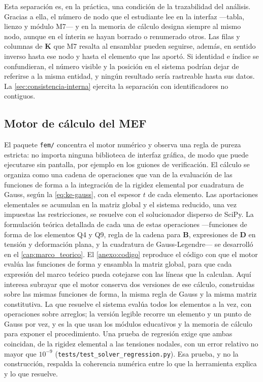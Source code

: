 Esta separación es, en la práctica, una condición de la trazabilidad del análisis. Gracias a ella, el número de nodo que el estudiante lee en la interfaz ---tabla, lienzo y módulo M7--- y en la memoria de cálculo designa siempre al mismo nodo, aunque en el ínterin se hayan borrado o renumerado otros. Las filas y columnas de $\bm{K}$ que M7 resalta al ensamblar pueden seguirse, además, en sentido inverso hasta ese nodo y hasta el elemento que las aportó. Si identidad e índice se confundieran, el número visible y la posición en el sistema podrían dejar de referirse a la misma entidad, y ningún resultado sería rastreable hasta sus datos. La \autoref{sec:consistencia-interna} ejercita la separación con identificadores no contiguos.

\subsection{Motor de cálculo del MEF}
\label{sec:motor}

El paquete \texttt{fem/} concentra el motor numérico y observa una regla de pureza estricta: no importa ninguna biblioteca de interfaz gráfica, de modo que puede ejecutarse sin pantalla, por ejemplo en los guiones de verificación. El cálculo se organiza como una cadena de operaciones que van de la evaluación de las funciones de forma a la integración de la rigidez elemental por cuadratura de Gauss, según la \autoref{eq:ke-gauss}, con el espesor $t$ de cada elemento. Las aportaciones elementales se acumulan en la matriz global y el sistema reducido, una vez impuestas las restricciones, se resuelve con el solucionador disperso de SciPy. La formulación teórica detallada de cada una de estas operaciones —funciones de forma de los elementos Q4 y Q9, regla de la cadena para $\bm{B}$, expresiones de $\bm{D}$ en tensión y deformación plana, y la cuadratura de Gauss-Legendre— se desarrolló en el \autoref{cap:marco_teorico}. El \autoref{anexo:codigo} reproduce el código con que el motor evalúa las funciones de forma y ensambla la matriz global, para que cada expresión del marco teórico pueda cotejarse con las líneas que la calculan. Aquí interesa subrayar que el motor conserva dos versiones de ese cálculo, construidas sobre las mismas funciones de forma, la misma regla de Gauss y la misma matriz constitutiva. La que resuelve el sistema evalúa todos los elementos a la vez, con operaciones sobre arreglos; la versión legible recorre un elemento y un punto de Gauss por vez, y es la que usan los módulos educativos y la memoria de cálculo para exponer el procedimiento. Una prueba de regresión exige que ambas coincidan, de la rigidez elemental a las tensiones nodales, con un error relativo no mayor que $10^{-9}$ (\texttt{tests/test\_solver\_regression.py}). Esa prueba, y no la construcción, respalda la coherencia numérica entre lo que la herramienta explica y lo que resuelve.

